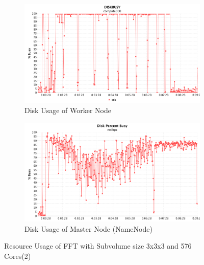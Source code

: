 \begin{figure}[h]
\centering
\begin{subfigure}{1\textwidth}
  \centering
  \includegraphics[width=1\linewidth]{figures/FFT131_576_DISK.png}
  \caption{Disk Usage of Worker Node}
  \label{FFT131_576_DISK}
\end{subfigure}
\begin{subfigure}{1\textwidth}
  \centering
  \includegraphics[width=1\linewidth]{figures/FFT131_576_DISK_Master.png}
  \caption{Disk Usage of Master Node (NameNode)}
  \label{FFT131_576_DISK_Master}
\end{subfigure}
\caption{Resource Usage of FFT with Subvolume size 3x3x3 and 576 Cores(2)}
\label{FFT131_576_2}
\end{figure}


